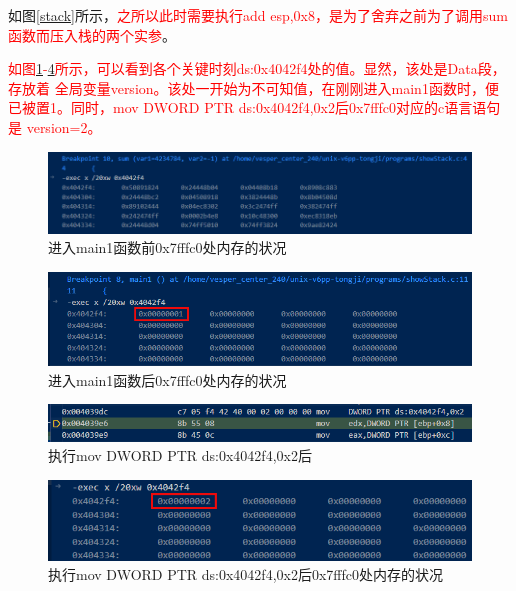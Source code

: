 如图\ref{stack}所示，\textcolor{red}{之所以此时需要执行add esp,0x8，是为了舍弃之前为了调用sum函数而压入栈的两个实参}。

\textcolor{red}{如图\ref{beforemain}-\ref{afterexec}所示，可以看到各个关键时刻ds:0x4042f4处的值。显然，该处是Data段，存放着
全局变量version。该处一开始为不可知值，在刚刚进入main1函数时，便已被置1。同时，mov DWORD PTR ds:0x4042f4,0x2后0x7fffc0对应的c语言语句是
version=2。}

\begin{figure}[!htbp]
    \centering
    \includegraphics[width=\textwidth]{figures/beforemain.png}
    \caption{进入main1函数前0x7fffc0处内存的状况}\label{beforemain}
\end{figure}
\begin{figure}[!htbp]
    \centering
    \includegraphics[width=\textwidth]{figures/aftermain.png}
    \caption{进入main1函数后0x7fffc0处内存的状况}\label{aftermain}
\end{figure}
\begin{figure}[!htbp]
    \centering
    \includegraphics[width=\textwidth]{figures/exec02.png}
    \caption{执行mov DWORD PTR ds:0x4042f4,0x2后}\label{exec02}
\end{figure}
\begin{figure}[!htbp]
    \centering
    \includegraphics[width=\textwidth]{figures/afterexec.png}
    \caption{执行mov DWORD PTR ds:0x4042f4,0x2后0x7fffc0处内存的状况}\label{afterexec}
\end{figure}



